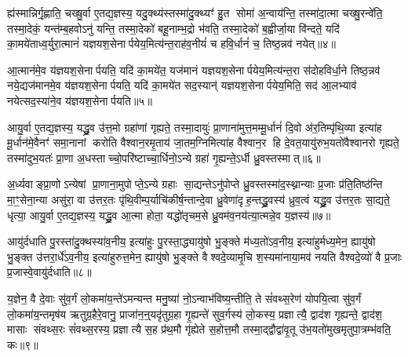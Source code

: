 ह्य॑स्मान्निर्गृ॒ह्णाति॒ चख्षु॒र्वा ए॒तद्य॒ज्ञस्य॒ यदु॒क्थ्य॑स्तस्मा॑दु॒क्थ्यꣳ॑ हु॒त सोमा॑ अ॒न्वाय॑न्ति॒ तस्मा॑दा॒त्मा चख्षु॒रन्वे॑ति॒ तस्मा॒देकं॒ यन्त॑म्ब॒हवोऽनु॑ यन्ति॒ तस्मा॒देको॑ बहू॒नाम्भ॒द्रो भ॑वति॒ तस्मा॒देको॑ ब॒ह्वीर्जा॒या वि॑न्दते॒ यदि॑ का॒मये॑ताध्व॒र्युरा॒त्मानं॑ यज्ञयश॒सेनार्पयेय॒मित्य॑न्त॒राह॑व॒नीयं॑ च हवि॒र्धानं॑ च॒ तिष्ठ॒न्नव॑ नयेत्॥४॥

आ॒त्मान॑मे॒व य॑ज्ञयश॒सेनार्पयति॒ यदि॑ का॒मये॑त॒ यज॑मानं यज्ञयश॒सेनार्पयेय॒मित्य॑न्त॒रा स॑दोहविर्धा॒ने तिष्ठ॒न्नव॑ नये॒द्यज॑मानमे॒व य॑ज्ञयश॒सेनार्पयति॒ यदि॑ का॒मये॑त सद॒स्यान्॑ यज्ञयश॒सेनार्पयेय॒मिति॒ सद॑ आ॒लभ्याव॑ नयेत्सद॒स्या॑ने॒व य॑ज्ञयश॒सेनार्पयति॥५॥

{\anuvakamend[{इतीन्द्रि॒यमे॒व पुनः॑पुनर्नये॒त्त्रय॑स्त्रिशच्च॥१॥}]}

आयु॒र्वा ए॒तद्य॒ज्ञस्य॒ यद्ध्रु॒व उ॑त्त॒मो ग्रहा॑णां गृह्यते॒ तस्मा॒दायुः॑ प्रा॒णाना॑मुत्त॒मम्मू॒र्धानं॑ दि॒वो अ॑र॒तिम्पृ॑थि॒व्या इत्या॑ह मू॒र्धान॑मे॒वैनꣳ॑ समा॒नानां करोति वैश्वान॒रमृ॒ताय॑ जा॒तम॒ग्निमित्या॑ह वैश्वान॒र हि दे॒वत॒यायु॑रुभ॒यतो॑वैश्वानरो गृह्यते॒ तस्मा॑दुभ॒यतः॑ प्रा॒णा अ॒धस्ताच्चो॒परि॑ष्टाच्चा॒र्धिनो॒ऽन्ये ग्रहा॑ गृ॒ह्यन्ते॒ऽर्धी ध्रु॒वस्तस्मात्॥६॥

अ॒र्ध्यवाङ्प्रा॒णोऽन्येषां प्रा॒णाना॒मुपोप्ते॒ऽन्ये ग्रहाः सा॒द्यन्तेऽनु॑पोप्ते ध्रु॒वस्तस्मा॑द॒स्थ्नान्याः प्र॒जाः प्र॑ति॒तिष्ठ॑न्ति मा॒ꣳ॒सेना॒न्या असु॑रा॒ वा उ॑त्तर॒तः पृ॑थि॒वीम्प॒र्याचि॑कीर्\mbox{}ष॒न्तान्दे॒वा ध्रु॒वेणा॑दृह॒न्तद्ध्रु॒वस्य॑ ध्रुव॒त्वं यद्ध्रु॒व उ॑त्तर॒तः सा॒द्यते॒ धृत्या॒ आयु॒र्वा ए॒तद्य॒ज्ञस्य॒ यद्ध्रु॒व आ॒त्मा होता॒ यद्धो॑तृचम॒से ध्रु॒वम॑व॒नय॑त्या॒त्मन्ने॒व य॒ज्ञस्य॑॥७॥

आयु॑र्दधाति पु॒रस्ता॑दु॒क्थस्या॑व॒नीय॒ इत्या॑हुः पु॒रस्ता॒द्ध्यायु॑षो भु॒ङ्क्ते म॑ध्य॒तो॑ऽव॒नीय॒ इत्या॑हुर्मध्य॒मेन॒ ह्यायु॑षो भु॒ङ्क्त उ॑त्तरा॒र्धे॑ऽव॒नीय॒ इत्या॑हुरुत्त॒मेन॒ ह्यायु॑षो भु॒ङ्क्ते वैश्वदे॒व्यामृ॒चि श॒स्यमा॑नाया॒मव॑ नयति वैश्वदे॒व्यो॑ वै प्र॒जाः प्र॒जास्वे॒वायु॑र्दधाति॥८॥

{\anuvakamend[{ध्रु॒वस्तस्मा॑दे॒व य॒ज्ञस्यैका॒न्नच॑त्वारि॒ꣳ॒शच्च॑॥२॥}]}

य॒ज्ञेन॒ वै दे॒वाः सु॑व॒र्गं लो॒कमा॑य॒न्ते॑ऽमन्यन्त मनु॒ष्या॑ नो॒ऽन्वाभ॑विष्य॒न्तीति॒ ते सं॑वथ्स॒रेण॑ योपयि॒त्वा सु॑व॒र्गं लो॒कमा॑य॒न्तमृष॑य ऋतुग्र॒हैरे॒वानु॒ प्राजा॑न॒न्॒यदृ॑तुग्र॒हा गृ॒ह्यन्ते॑ सुव॒र्गस्य॑ लो॒कस्य॒ प्रज्ञात्यै॒ द्वाद॑श गृह्यन्ते॒ द्वाद॑श॒ मासाः संवथ्स॒रः सं॑वथ्स॒रस्य॒ प्रज्ञात्यै स॒ह प्र॑थ॒मौ गृ॑ह्येते स॒होत्त॒मौ तस्मा॒द्द्वौद्वा॑वृ॒तू उ॑भ॒यतो॑मुखमृतुपा॒त्रम्भ॑वति॒ कः॥९॥

